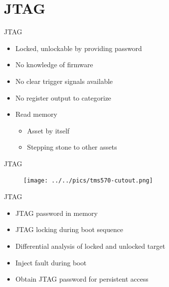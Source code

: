 \documentclass[table]{beamer}
\begin{document}
\section{JTAG}
\begin{frame}
    \tableofcontents[currentsection]
\end{frame}

\begin{frame}{JTAG}
    \begin{itemize}
        \item Locked, unlockable by providing password
        \item No knowledge of firmware
        \item No clear trigger signals available
        \item No register output to categorize
    \end{itemize}

    \begin{itemize}
      \item Read memory
      \begin{itemize}
        \item Asset by itself
        \item Stepping stone to other assets
      \end{itemize}
    \end{itemize}
\end{frame}

\begin{frame}{JTAG}
    \begin{figure}[H]
      \centering
      \texttt{[image: ../../pics/tms570-cutout.png]}
    \end{figure}
\end{frame}

\begin{frame}{JTAG}
  \begin{itemize}
    \item JTAG password in memory
    \item JTAG locking during boot sequence
  \end{itemize}
    \begin{itemize}
        \item Differential analysis of locked and unlocked target
        \item Inject fault during boot
        \item Obtain JTAG password for persistent access
    \end{itemize}
\end{frame}
\end{document}
